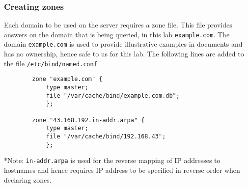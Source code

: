 \documentclass[a4paper,12pt]{article}
\begin{document}
		\subsubsection{Creating zones}
		\begin{par} Each domain to be used on the server requires a zone file. This file provides answers on the domain that is being queried, in this lab \texttt{example.com}. The domain \texttt{example.com} is used to provide illustrative examples in documents and has no ownership, hence safe to us for this lab. The following lines are added to the file \texttt{/etc/bind/named.conf}.
		\end{par}
		\begin{verbatim}
		zone "example.com" {
		    type master;
		    file "/var/cache/bind/example.com.db";
		    };
		    
		zone "43.168.192.in-addr.arpa" {
		    type master;
		    file "/var/cache/bind/192.168.43";
		    };
		\end{verbatim}
		*Note: \texttt{in-addr.arpa} is used for the reverse mapping of IP addresses to hostnames and hence requires IP address to be specified in reverse order when declaring zones.
\end{document}
